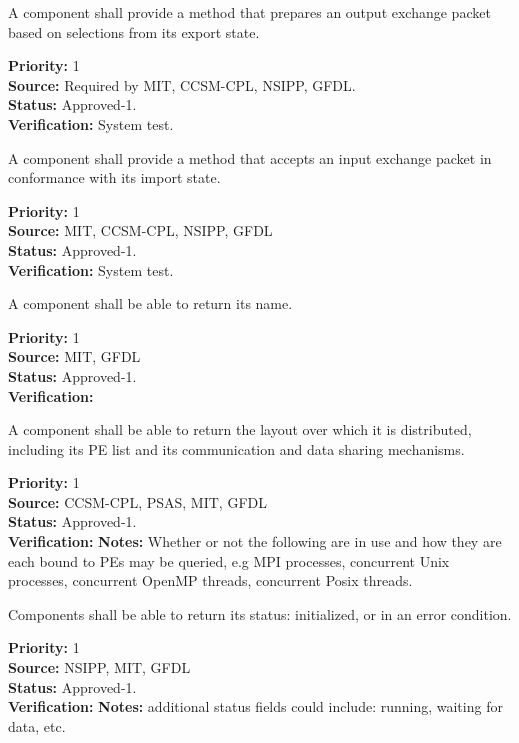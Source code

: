 A component shall provide a method that prepares an output exchange packet
based on selections from its export state.
\begin{reqlist}
{\bf Priority:} 1\\
{\bf Source:} Required by MIT, CCSM-CPL, NSIPP, GFDL. \\
{\bf Status:} Approved-1.\\
{\bf Verification:} System test.
\end{reqlist}

A component shall provide a method that accepts an input exchange packet
in conformance with its import state.
\begin{reqlist}
{\bf Priority:} 1\\
{\bf Source:} MIT, CCSM-CPL, NSIPP, GFDL \\
{\bf Status:} Approved-1.\\
{\bf Verification:} System test.
\end{reqlist}


A component shall be able to return its name.
\begin{reqlist}
{\bf Priority:} 1\\
{\bf Source:} MIT, GFDL \\
{\bf Status:} Approved-1.\\
{\bf Verification:}  
\end{reqlist}

A component shall be able to return the layout over which it is 
distributed, including its PE list and its communication and data 
sharing mechanisms.
\begin{reqlist}
{\bf Priority:} 1\\
{\bf Source:} CCSM-CPL, PSAS, MIT, GFDL \\
{\bf Status:} Approved-1.\\
{\bf Verification:}
{\bf Notes:}  Whether or not the following are in use and
how they are each bound to PEs may be queried, e.g MPI processes, 
concurrent Unix processes, concurrent OpenMP threads, concurrent 
Posix threads.
\end{reqlist}


Components shall be able to return its status:
initialized, or in an error condition.

\begin{reqlist}
{\bf Priority:} 1 \\
{\bf Source:} NSIPP, MIT, GFDL \\
{\bf Status:} Approved-1.\\
{\bf Verification:}  
{\bf Notes:} additional status fields could include: running, waiting for data,
etc.
\end{reqlist}

